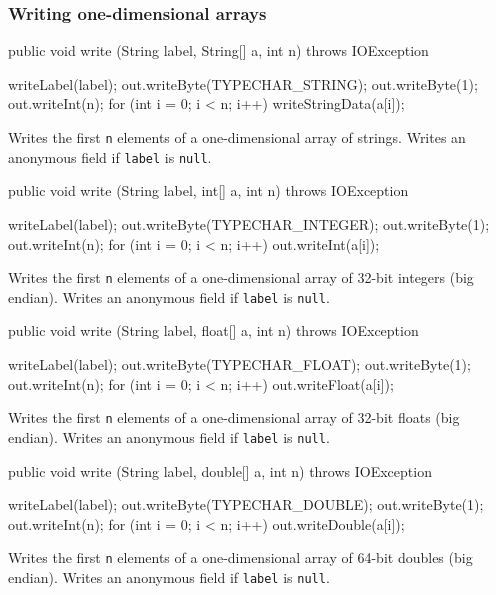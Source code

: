 \subsubsection*{Writing one-dimensional arrays}

\begin{code}

   public void write (String label, String[] a, int n) throws IOException \begin{hide} {
      writeLabel(label);
      out.writeByte(TYPECHAR_STRING);
      out.writeByte(1);
      out.writeInt(n);
      for (int i = 0; i < n; i++)
         writeStringData(a[i]);
   }
   \end{hide}
\end{code}
\begin{tabb}
Writes the first \texttt{n} elements of a one-dimensional array
of strings.
Writes an anonymous field if \texttt{label} is \texttt{null}.
\end{tabb}
\begin{code}

   public void write (String label, int[] a, int n) throws IOException \begin{hide} {
      writeLabel(label);
      out.writeByte(TYPECHAR_INTEGER);
      out.writeByte(1);
      out.writeInt(n);
      for (int i = 0; i < n; i++)
         out.writeInt(a[i]);
   }
   \end{hide}
\end{code}
\begin{tabb}
Writes the first \texttt{n} elements of a one-dimensional array
of 32-bit integers (big endian).
Writes an anonymous field if \texttt{label} is \texttt{null}.
\end{tabb}
\begin{code}

   public void write (String label, float[] a, int n) throws IOException \begin{hide} {
      writeLabel(label);
      out.writeByte(TYPECHAR_FLOAT);
      out.writeByte(1);
      out.writeInt(n);
      for (int i = 0; i < n; i++)
         out.writeFloat(a[i]);
   }
   \end{hide}
\end{code}
\begin{tabb}
Writes the first \texttt{n} elements of a one-dimensional array
of 32-bit floats (big endian).
Writes an anonymous field if \texttt{label} is \texttt{null}.
\end{tabb}
\begin{code}

   public void write (String label, double[] a, int n) throws IOException \begin{hide} {
      writeLabel(label);
      out.writeByte(TYPECHAR_DOUBLE);
      out.writeByte(1);
      out.writeInt(n);
      for (int i = 0; i < n; i++)
         out.writeDouble(a[i]);
   }
   \end{hide}
\end{code}
\begin{tabb}
Writes the first \texttt{n} elements of a one-dimensional array
of 64-bit doubles (big endian).
Writes an anonymous field if \texttt{label} is \texttt{null}.
\end{tabb}


